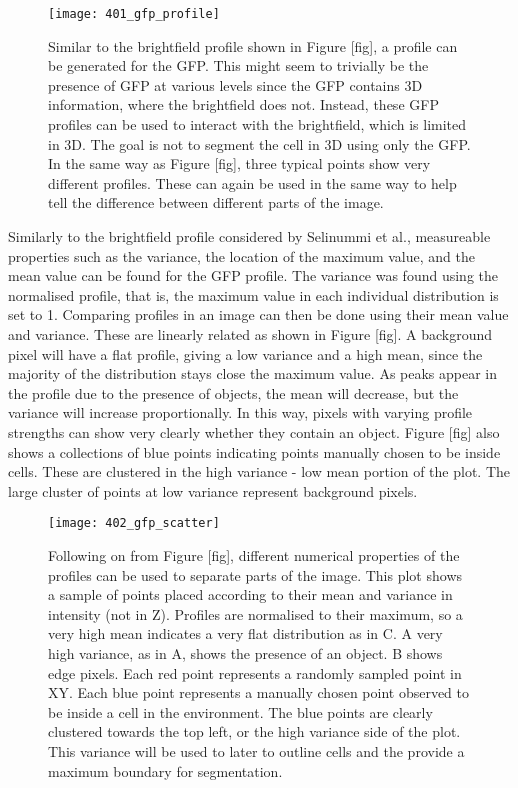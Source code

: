 \begin{figure}[h!]
 \centering
 \texttt{[image: 401\_gfp\_profile]}
 \caption[The GFP profile]{
 	Similar to the brightfield profile shown in Figure [fig], a profile can be generated for the GFP. This might seem to trivially be the presence of GFP at various levels since the GFP contains 3D information, where the brightfield does not. Instead, these GFP profiles can be used to interact with the brightfield, which is limited in 3D. The goal is not to segment the cell in 3D using only the GFP. In the same way as Figure [fig], three typical points show very different profiles. These can again be used in the same way to help tell the difference between different parts of the image.
 }
 \label{fig:gfpprofile}
\end{figure}

Similarly to the brightfield profile considered by Selinummi et al., measureable properties such as the variance, the location of the maximum value, and the mean value can be found for the GFP profile. The variance was found using the normalised profile, that is, the maximum value in each individual distribution is set to 1. Comparing profiles in an image can then be done using their mean value and variance. These are linearly related as shown in Figure [fig]. A background pixel will have a flat profile, giving a low variance and a high mean, since the majority of the distribution stays close the maximum value. As peaks appear in the profile due to the presence of objects, the mean will decrease, but the variance will increase proportionally. In this way, pixels with varying profile strengths can show very clearly whether they contain an object. Figure [fig] also shows a collections of blue points indicating points manually chosen to be inside cells. These are clustered in the high variance - low mean portion of the plot. The large cluster of points at low variance represent background pixels.

\begin{figure}[h!]
 \centering
 \texttt{[image: 402\_gfp\_scatter]}
 \caption[GFP scatter plot]{
 	Following on from Figure [fig], different numerical properties of the profiles can be used to separate parts of the image. This plot shows a sample of points placed according to their mean and variance in intensity (not in Z). Profiles are normalised to their maximum, so a very high mean indicates a very flat distribution as in C. A very high variance, as in A, shows the presence of an object. B shows edge pixels. Each red point represents a randomly sampled point in XY. Each blue point represents a manually chosen point observed to be inside a cell in the environment. The blue points are clearly clustered towards the top left, or the high variance side of the plot. This variance will be used to later to outline cells and the provide a maximum boundary for segmentation.
 }
 \label{fig:gfpscatter}
\end{figure}

